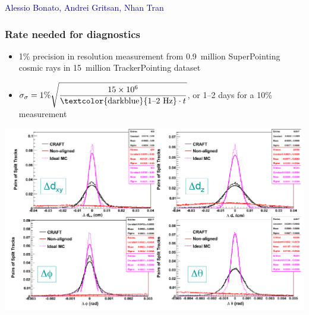 \documentclass[compress]{beamer}
\begin{document}
\begin{frame}
\hfill \scriptsize \textcolor{darkblue}{Alessio Bonato, Andrei Gritsan, Nhan Tran}
\end{frame}

\begin{frame}
\frametitle{Rate needed for diagnostics}

\begin{itemize}
\item 1\% precision in resolution measurement from 0.9~million
  SuperPointing cosmic rays in 15~million TrackerPointing dataset
\item $\sigma_\sigma = \mbox{1\%} \sqrt{\dfrac{15 \times 10^6}{\mbox{\textcolor{darkblue}{1--2 Hz}} \cdot t}}$, or 1--2 days for a 10\% measurement
\end{itemize}

\includegraphics[width=0.9\linewidth]{track_splitting_other_parameters.png}
\end{frame}
\end{document}
